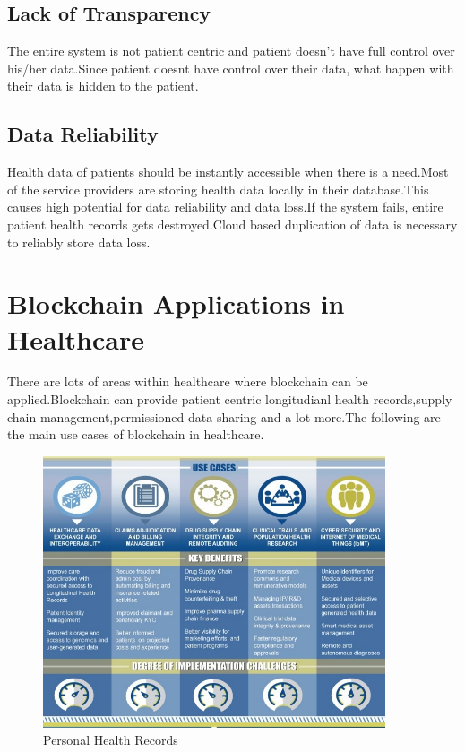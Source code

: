 \documentclass[12pt]{report}
\begin{document}
\section{Lack of Transparency}
The entire system is not patient centric and patient doesn't have full control over his/her data.Since patient doesnt have control over their data, what happen with their data is hidden to the patient.


\section{Data Reliability}
Health data of patients should be instantly accessible when there is a need.Most of the service providers are storing health data locally in their database.This causes high potential for data reliability and data loss.If the system fails, entire patient health records gets destroyed.Cloud based duplication of data is necessary to reliably store data loss.


\chapter{Blockchain Applications in Healthcare}
There are lots of areas within healthcare where blockchain can be applied.Blockchain can provide patient centric longitudianl health records,supply chain management,permissioned data sharing and a lot more.The following are the main use cases of blockchain in  healthcare.
\begin{figure}[H]
\centering
\includegraphics[width=0.9\textwidth]{apps.jpg}
\caption{Personal Health Records}
\label{ppr}
\end{figure}
\end{document}
